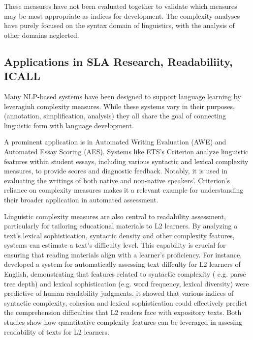 These measures have
not been evaluated together to validate which measures may be most appropriate as indices for development. The
complexity analyses have purely focused on the syntax domain of linguistics, with the
analysis of other domains neglected.

\subsection{Applications in SLA Research, Readabiliity, ICALL}

Many NLP-based systems have been designed to support language learning by leveraginh complexity measures. While these
systems
vary
in their purposes, (annotation, simplification, analysis) they all
share
the goal
of connecting linguistic form with language development.

A prominent application is in Automated Writing Evaluation (AWE) and Automated Essay Scoring (AES). Systems like
ETS's Criterion \citep{criterion2006} analyze linguistic features within student essays, including various syntactic
and lexical complexity measures, to provide scores and diagnostic feedback. Notably, it is used in evaluating
the writings of both native and non-native speakers'.
 Criterion's reliance on complexity measures makes it a relevant example for
understanding their broader application in automated assessment.

Linguistic complexity measures are also central to readability assessment, particularly for tailoring educational
materials to L2 learners. By analyzing a text's lexical sophistication, syntactic density and other complexity
features, systems can estimate a text's difficulty level. This capability is crucial for ensuring that reading
materials align with a learner's proficiency. For instance, \citet{vajjala2012} developed a system for automatically
assessing text diffculty for L2 learners of English, demonstrating that features related to syntactic complexity (
e.g. parse tree depth) and lexical sophistication (e.g. word frequency, lexical diversity) were predictive of human
readability judgments. \citet{crossley2014} it showed that various indices of syntactic complexity, cohesion and
lexical sophistication
could effectively predict the comprehension difficulties that L2 readers face with expository texts. Both studies
show how quantitative complexity features can be leveraged in assesing readability of texts for L2 learners.

